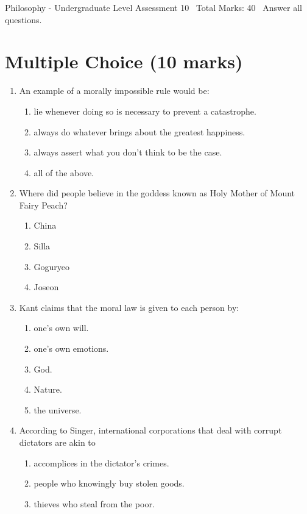 \documentclass[12pt]{article}
\begin{document}
\begin{center}
Philosophy - Undergraduate Level Assessment 10 \
Total Marks: 40 \
Answer all questions.
\end{center}

\section*{Multiple Choice (10 marks)}
\begin{enumerate}[label=\arabic*.]
\item An example of a morally impossible rule would be:
\begin{enumerate}[label=(\alph*)]
    \item lie whenever doing so is necessary to prevent a catastrophe.
    \item always do whatever brings about the greatest happiness.
    \item always assert what you don't think to be the case.
    \item all of the above.
\end{enumerate}
\item Where did people believe in the goddess known as Holy Mother of Mount Fairy Peach?
\begin{enumerate}[label=(\alph*)]
    \item China
    \item Silla
    \item Goguryeo
    \item Joseon
\end{enumerate}
\item Kant claims that the moral law is given to each person by:
\begin{enumerate}[label=(\alph*)]
    \item one's own will.
    \item one's own emotions.
    \item God.
    \item Nature.
    \item the universe.
\end{enumerate}
\item According to Singer, international corporations that deal with corrupt dictators are akin to
\begin{enumerate}[label=(\alph*)]
    \item accomplices in the dictator's crimes.
    \item people who knowingly buy stolen goods.
    \item thieves who steal from the poor.

\end{enumerate}
\end{enumerate}
\end{document}
